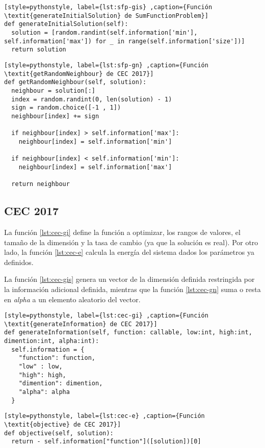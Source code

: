 \begin{lstlisting}[style=pythonstyle, label={lst:sfp-gis} ,caption={Función \textit{generateInitialSolution} de SumFunctionProblem}]
def generateInitialSolution(self):
  solution = [random.randint(self.information['min'], self.information['max']) for _ in range(self.information['size'])]
  return solution
\end{lstlisting}

\begin{lstlisting}[style=pythonstyle, label={lst:sfp-gn} ,caption={Función \textit{getRandomNeighbour} de CEC 2017}]
def getRandomNeighbour(self, solution):
  neighbour = solution[:]
  index = random.randint(0, len(solution) - 1)
  sign = random.choice([-1 , 1])
  neighbour[index] += sign

  if neighbour[index] > self.information['max']:
    neighbour[index] = self.information['min']

  if neighbour[index] < self.information['min']:
	neighbour[index] = self.information['max']

  return neighbour
\end{lstlisting}

\subsection{CEC 2017}

La función \ref{lst:cec-gi} define la función a optimizar, los rangos de valores, el tamaño de la dimensión y la tasa de cambio (ya que la solución es real). Por otro lado, la función \ref{lst:cec-e} calcula la energía del sistema dados los parámetros ya definidos.

La función \ref{lst:cec-gis} genera un vector de la dimensión definida restringida por la información adicional definida, mientras que la función \ref{lst:cec-gn} suma  o resta en \textit{alpha} a un elemento aleatorio del vector.

\begin{lstlisting}[style=pythonstyle, label={lst:cec-gi} ,caption={Función \textit{generateInformation} de CEC 2017}]
def generateInformation(self, function: callable, low:int, high:int, dimention:int, alpha:int):
  self.information = {
	"function": function,
	"low" : low,
	"high": high,
	"dimention": dimention,
	"alpha": alpha
  }
\end{lstlisting}

\begin{lstlisting}[style=pythonstyle, label={lst:cec-e} ,caption={Función \textit{objective} de CEC 2017}]
def objective(self, solution):
  return - self.information["function"]([solution])[0]
\end{lstlisting}

